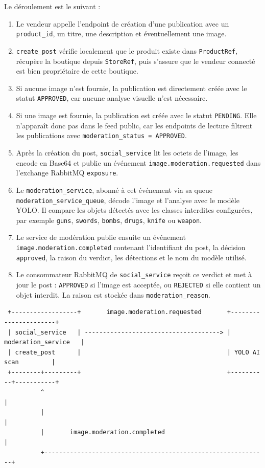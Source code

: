 \documentclass[11pt,a4paper]{article}
\begin{document}
Le déroulement est le suivant :
\begin{enumerate}
  \item Le vendeur appelle l'endpoint de création d'une publication avec un \texttt{product\_id}, un titre, une description et éventuellement une image.
  \item \texttt{create\_post} vérifie localement que le produit existe dans \texttt{ProductRef}, récupère la boutique depuis \texttt{StoreRef}, puis s'assure que le vendeur connecté est bien propriétaire de cette boutique.
  \item Si aucune image n'est fournie, la publication est directement créée avec le statut \texttt{APPROVED}, car aucune analyse visuelle n'est nécessaire.
  \item Si une image est fournie, la publication est créée avec le statut \texttt{PENDING}. Elle n'apparaît donc pas dans le feed public, car les endpoints de lecture filtrent les publications avec \texttt{moderation\_status = APPROVED}.
  \item Après la création du post, \texttt{social\_service} lit les octets de l'image, les encode en Base64 et publie un événement \texttt{image.moderation.requested} dans l'exchange RabbitMQ \texttt{exposure}.
  \item Le \texttt{moderation\_service}, abonné à cet événement via sa queue \texttt{moderation\_service\_queue}, décode l'image et l'analyse avec le modèle YOLO. Il compare les objets détectés avec les classes interdites configurées, par exemple \texttt{guns}, \texttt{swords}, \texttt{bombs}, \texttt{drugs}, \texttt{knife} ou \texttt{weapon}.
  \item Le service de modération publie ensuite un événement \texttt{image.moderation.completed} contenant l'identifiant du post, la décision \texttt{approved}, la raison du verdict, les détections et le nom du modèle utilisé.
  \item Le consommateur RabbitMQ de \texttt{social\_service} reçoit ce verdict et met à jour le post : \texttt{APPROVED} si l'image est acceptée, ou \texttt{REJECTED} si elle contient un objet interdit. La raison est stockée dans \texttt{moderation\_reason}.
\end{enumerate}

\begin{verbatim}
 +------------------+       image.moderation.requested       +----------------------+
 | social_service   | -------------------------------------> | moderation_service   |
 | create_post      |                                        | YOLO AI scan         |
 +--------+---------+                                        +----------+-----------+
          ^                                                             |
          |                                                             |
          |       image.moderation.completed                            |
          +-------------------------------------------------------------+
\end{verbatim}
\end{document}

